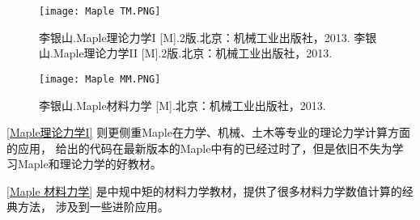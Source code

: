 \begin{large}
\begin{spacing}{1.5}
        \begin{figure}[htbp]
            \centering
            \begin{minipage}[t]
                {0.45\textwidth}
                \centering
                \texttt{[image: Maple TM.PNG]}
                \caption{李银山.Maple理论力学I [M].2版.北京：机械工业出版社，2013.
                李银山.Maple理论力学II [M].2版.北京：机械工业出版社，2013.
                }

                \label{Maple理论力学I}%
            \end{minipage}
            \quad
            \begin{minipage}[t]
                {0.45\textwidth}
                \centering
                \texttt{[image: Maple MM.PNG]}
                \caption{李银山.Maple材料力学 [M].北京：机械工业出版社，2013.}
                \label{Maple 材料力学}%
            \end{minipage}

        \end{figure}%
        \autoref{Maple理论力学I} \cite[Maple 理论力学 I]{李银山2013maple} 则更侧重Maple在力学、机械、土木等专业的理论力学计算方面的应用，
        给出的代码在最新版本的Maple中有的已经过时了，但是依旧不失为学
        习Maple和理论力学的好教材。

        \autoref{Maple 材料力学} \cite[Maple 材料力学]{李银山2013maple2} 是中规中矩的材料力学教材，提供了很多材料力学数值计算的经典方法，
        涉及到一些进阶应用。
    \end{spacing}
\end{large}


\restoregeometry

% 